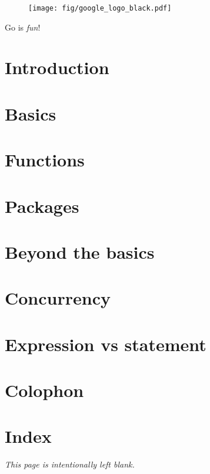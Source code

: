 \documentclass[a4paper,twoside]{blocksbook}
\begin{document}
\newpage
{}
\tableofcontents
\lstlistoflistings
\listoffigures
\listoftables
\listofex

\clearpage
\thispagestyle{empty}
\begin{figure}[H]
\begin{center}
\texttt{[image: fig/google\_logo\_black.pdf]}
\end{center}
\end{figure}

\begin{center}
\vspace{8.0cm}
Go is \emph{fun}!
\end{center}



\chapter{Introduction}
\label{chap:intro}


\chapter{Basics}
\label{chap:basics}


\chapter{Functions}
\label{chap:functions}


\chapter{Packages}
\label{chap:packages}


\chapter{Beyond the basics}
\label{chap:beyond}


\chapter{Concurrency}
\label{chap:channels}


\appendix
\chapter{Expression vs statement}
\label{chap:expression}


\chapter{Colophon}


\chapter{Index}
\printindex


\newpage
\emph{This page is intentionally left blank.}
\end{document}

